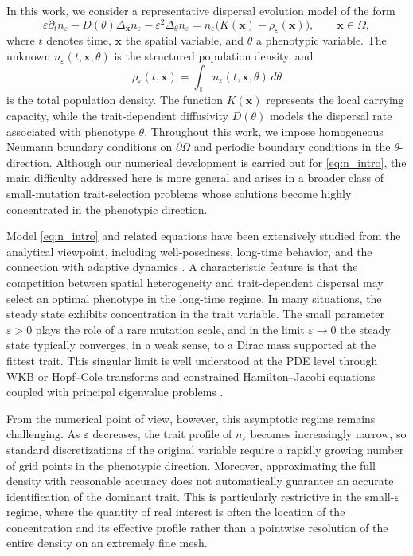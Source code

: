 \documentclass[11pt, dina4, amsfont12]{article}
\begin{document}
In this work, we consider a representative dispersal evolution model of the form
\begin{equation}\label{eq:n_intro}
    \varepsilon \partial_t n_\varepsilon
    -D(\theta)\Delta_\mathbf{x} n_\varepsilon
    -\varepsilon^2\Delta_\theta n_\varepsilon
    =
    n_\varepsilon\bigl(K(\mathbf{x})-\rho_\varepsilon(\mathbf{x})\bigr),
    \qquad \mathbf{x}\in\Omega,
\end{equation}
where $t$ denotes time, $\mathbf{x}$ the spatial variable, and $\theta$ a phenotypic variable. The unknown $n_\varepsilon(t,\mathbf{x},\theta)$ is the structured population density, and
\[
\rho_\varepsilon(t,\mathbf{x})
=
\int_{\mathbb T} n_\varepsilon(t,\mathbf{x},\theta)\,d\theta
\]
is the total population density. The function $K(\mathbf{x})$ represents the local carrying capacity, while the trait-dependent diffusivity $D(\theta)$ models the dispersal rate associated with phenotype $\theta$. Throughout this work, we impose homogeneous Neumann boundary conditions on $\partial\Omega$ and periodic boundary conditions in the $\theta$-direction. Although our numerical development is carried out for \eqref{eq:n_intro}, the main difficulty addressed here is more general and arises in a broader class of small-mutation trait-selection problems whose solutions become highly concentrated in the phenotypic direction.

Model \eqref{eq:n_intro} and related equations have been extensively studied from the analytical viewpoint, including well-posedness, long-time behavior, and the connection with adaptive dynamics \cite{MirrahimiPerthame,PerthameSouganidis,AlmeidaPerthameRuan}. A characteristic feature is that the competition between spatial heterogeneity and trait-dependent dispersal may select an optimal phenotype in the long-time regime. In many situations, the steady state exhibits concentration in the trait variable. The small parameter $\varepsilon>0$ plays the role of a rare mutation scale, and in the limit $\varepsilon\to0$ the steady state typically converges, in a weak sense, to a Dirac mass supported at the fittest trait. This singular limit is well understood at the PDE level through WKB or Hopf--Cole transforms and constrained Hamilton--Jacobi equations coupled with principal eigenvalue problems \cite{PerthameSouganidis,BarlesPerthame,MirrahimiPerthame}.

From the numerical point of view, however, this asymptotic regime remains challenging. As $\varepsilon$ decreases, the trait profile of $n_\varepsilon$ becomes increasingly narrow, so standard discretizations of the original variable require a rapidly growing number of grid points in the phenotypic direction. Moreover, approximating the full density with reasonable accuracy does not automatically guarantee an accurate identification of the dominant trait. This is particularly restrictive in the small-$\varepsilon$ regime, where the quantity of real interest is often the location of the concentration and its effective profile rather than a pointwise resolution of the entire density on an extremely fine mesh.
\end{document}
